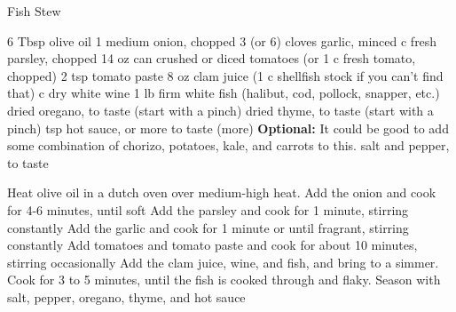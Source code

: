 \documentclass[../cookbook.tex]{subfiles}
\begin{document}
\begin{recipe}{Fish Stew}


\ingredients
{6 Tbsp olive oil}
{1 medium onion, chopped}
{3 (or 6) cloves garlic, minced}
{ c fresh parsley, chopped}
{14 oz can crushed or diced tomatoes (or 1 c fresh tomato, chopped)}
{2 tsp tomato paste}
{8 oz clam juice (1 c shellfish stock if you can't find that)}
{ c dry white wine}
{1  lb firm white fish (halibut, cod, pollock, snapper, etc.)}
{dried oregano, to taste (start with a pinch)}
{dried thyme, to taste (start with a pinch)}
{ tsp hot sauce, or more to taste (more)}
{\textbf{Optional:} It could be good to add some combination of chorizo, potatoes, kale, and carrots to this.}
{salt and pepper, to taste}
\stopingredients

\preparation
{Heat olive oil in a dutch oven over medium-high heat. Add the onion and cook for 4-6 minutes, until soft}
{Add the parsley and cook for 1 minute, stirring constantly}
{Add the garlic and cook for 1 minute or until fragrant, stirring constantly}
{Add tomatoes and tomato paste and cook for about 10 minutes, stirring occasionally}
{Add the clam juice, wine, and fish, and bring to a simmer. Cook for 3 to 5 minutes, until the fish is cooked through and flaky.}
{Season with salt, pepper, oregano, thyme, and hot sauce}
\stopprep
\end{recipe}
\end{document}
